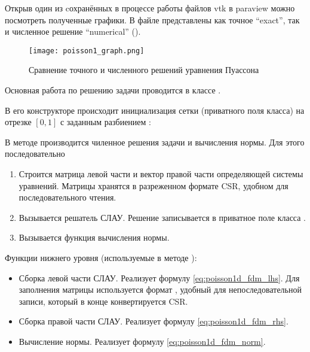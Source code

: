 Открыв один из cохранённых в процессе работы файлов vtk  в paraview
можно посмотреть полученные графики. В файле представлены как точное ``exact'', так и численное решение ``numerical''
().

\begin{figure}[h]
\centering
\texttt{[image: poisson1\_graph.png]}
\caption{Сравнение точного и численного решений уравнения Пуассона}
\label{fig:poisson_graph}
\end{figure}


Основная работа по решению задачи проводится в классе .

В его конструкторе происходит инициализация сетки (приватного поля класса) на отрезке $[0, 1]$ с заданным разбиением
:

В методе  производится чиленное решения задачи и вычисления нормы.
Для этого последовательно
\begin{enumerate}
\item Строится матрица левой части и вектор правой части определяющей системы уравнений.
      Матрицы хранятся в разреженном формате CSR, удобном для последовательного чтения.
\item Вызывается решатель СЛАУ. Решение записывается в приватное поле класса .
\item Вызывается функция вычисления нормы.
\end{enumerate}


Функции нижнего уровня (используемые в методе ):
\begin{itemize}
\item
  Сборка левой части СЛАУ. Реализует формулу \eqref{eq:poisson1d_fdm_lhs}.
  Для заполнения матрицы используется формат , удобный для непоследовательной записи, который в конце конвертируется CSR.
\item
  Сборка правой части СЛАУ. Реализует формулу \eqref{eq:poisson1d_fdm_rhs}.
\item
  Вычисление нормы. Реализует формулу \eqref{eq:poisson1d_fdm_norm}.
\end{itemize}

